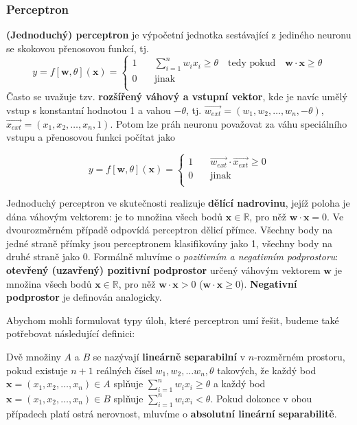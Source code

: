 \documentclass[11pt]{report} %
\newcommand{\R}{\mathbb{R}}
\renewcommand{\vec}[1]{\mathbf{#1}}
\numberwithin{equation}{section}
\begin{document}
\subsubsection{Perceptron}
\textbf{(Jednoduchý) perceptron} je výpočetní jednotka sestávající z jediného neuronu se skokovou přenosovou funkcí, tj.
$$
y = f[\vec{w},\theta](\vec{x}) = 
\begin{cases}
1 	& \quad \sum\limits_{i=1}^n w_i x_i \geq \theta \quad \text{tedy pokud} \quad \vec{w}\cdot\vec{x} \geq \theta\\
0 	& \quad \text{jinak}\\
\end{cases}
$$
Často se uvažuje tzv. \textbf{rozšířený váhový a vstupní vektor}, kde je navíc umělý vstup s konstantní hodnotou 1 a vahou $-\theta$, tj. $\overrightarrow{w_{ext}} = (w_1, w_2, \dots, w_n, -\theta)$, $\overrightarrow{x_{ext}} = (x_1, x_2, \dots, x_n, 1)$. Potom lze práh neuronu považovat za váhu speciálního vstupu a přenosovou funkci počítat jako 

$$
y = f[\vec{w},\theta](\vec{x}) = 
\begin{cases}
1 	& \quad \overrightarrow{w_{ext}}\cdot\overrightarrow{x_{ext}} \geq 0\\
0 	& \quad \text{jinak}\\
\end{cases}
$$

Jednoduchý perceptron ve skutečnosti realizuje \textbf{dělící nadrovinu}, jejíž poloha je dána váhovým vektorem: je to množina všech bodů $\vec{x} \in \R$, pro něž $\vec{w}\cdot\vec{x} = 0$. Ve dvourozměrném případě odpovídá perceptron dělicí přímce. Všechny body na jedné straně přímky jsou perceptronem klasifikovány jako 1, všechny body na druhé straně jako 0. Formálně mluvíme o \textit{pozitivním a negativním podprostoru}: \textbf{otevřený (uzavřený) pozitivní podprostor} určený váhovým vektorem $\vec{w}$ je množina všech bodů $\vec{x} \in \R$, pro něž $\vec{w}\cdot\vec{x} > 0$ ($\vec{w}\cdot\vec{x} \geq 0$). \textbf{Negativní podprostor} je definován analogicky.

Abychom mohli formulovat typy úloh, které perceptron umí řešit, budeme také potřebovat následující definici:

Dvě množiny $A$ a $B$ se nazývají \textbf{lineárně separabilní} v $n$-rozměrném prostoru, pokud existuje $n+1$ reálných čísel $w_1, w_2, \dots w_n, \theta$ takových, že každý bod $\vec{x} = (x_1, x_2, \dots, x_n) \in A$ splňuje $\sum\limits_{i=1}^n w_i x_i \geq \theta$ a každý bod $\vec{x} = (x_1, x_2, \dots, x_n) \in B$ splňuje $\sum\limits_{i=1}^n w_i x_i < \theta$. Pokud dokonce v obou případech platí ostrá nerovnost, mluvíme o \textbf{absolutní lineární separabilitě}. 
\end{document}
